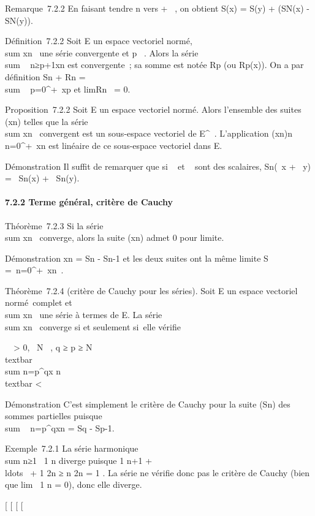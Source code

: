 Remarque~7.2.2 En faisant tendre n vers + \infty~, on obtient S(x) = S(y) +
(SN(x) - SN(y)).

Définition~7.2.2 Soit E un espace vectoriel normé,
\\sum  xn~ une
série convergente et p \in {}~. Alors la série
\\sum ~
n≥p+1xn est convergente~; sa somme est notée
Rp (ou Rp(x)). On a par définition Sn +
Rn = \\sum ~
p=0^+\infty~xp et
limRn~ = 0.

Proposition~7.2.2 Soit E un espace vectoriel normé. Alors l'ensemble des
suites (xn) telles que la série
\\sum  xn~
convergent est un sous-espace vectoriel de E^~. L'application
(xn)n\in{}~\mapsto~\\\sum
 n=0^+\infty~xn est linéaire de ce sous-espace
vectoriel dans E.

Démonstration Il suffit de remarquer que si \alpha~ et \beta~ sont des scalaires,
Sn(\alpha~x + \beta~y) = \alpha~Sn(x) + \beta~Sn(y).

\paragraph{7.2.2 Terme général, critère de Cauchy}

Théorème~7.2.3 Si la série
\\sum  xn~
converge, alors la suite (xn) admet 0 pour limite.

Démonstration xn = Sn - Sn-1 et les deux
suites ont la même limite S =\
\sum  n=0^+\infty~xn~.

Théorème~7.2.4 (critère de Cauchy pour les séries). Soit E un espace
vectoriel normé~complet et
\\sum  xn~ une
série à termes de E. La série
\\sum  xn~
converge si et seulement si~elle vérifie

\forall~~\epsilon \textgreater{} 0,
\exists~N \in {}~, q ≥ p ≥ N
\rigtharrow~\\textbar{}\\sum
n=p^qx n\\textbar{}
\textless{} \epsilon

Démonstration C'est simplement le critère de Cauchy pour la suite
(Sn) des sommes partielles puisque
\\sum ~
n=p^qxn = Sq - Sp-1.

Exemple~7.2.1 La série harmonique
\\sum  n≥1~ 1
\over n diverge puisque  1 \over n+1
+ \\ldots~ + 1
n ≥ n  \over 2n = 1
\over 2 . La série ne vérifie donc pas le critère de
Cauchy (bien que lim~ 1 \over
n = 0), donc elle diverge.

{[}
{[}
{[}
{[}
